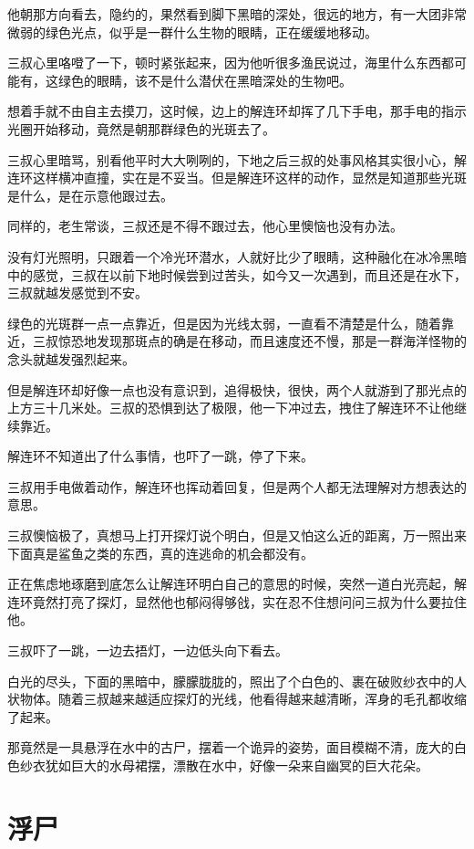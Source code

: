 他朝那方向看去，隐约的，果然看到脚下黑暗的深处，很远的地方，有一大团非常微弱的绿色光点，似乎是一群什么生物的眼睛，正在缓缓地移动。

三叔心里咯噔了一下，顿时紧张起来，因为他听很多渔民说过，海里什么东西都可能有，这绿色的眼睛，该不是什么潜伏在黑暗深处的生物吧。

想着手就不由自主去摸刀，这时候，边上的解连环却挥了几下手电，那手电的指示光圈开始移动，竟然是朝那群绿色的光斑去了。

三叔心里暗骂，别看他平时大大咧咧的，下地之后三叔的处事风格其实很小心，解连环这样横冲直撞，实在是不妥当。但是解连环这样的动作，显然是知道那些光斑是什么，是在示意他跟过去。

同样的，老生常谈，三叔还是不得不跟过去，他心里懊恼也没有办法。

没有灯光照明，只跟着一个冷光环潜水，人就好比少了眼睛，这种融化在冰冷黑暗中的感觉，三叔在以前下地时候尝到过苦头，如今又一次遇到，而且还是在水下，三叔就越发感觉到不安。

绿色的光斑群一点一点靠近，但是因为光线太弱，一直看不清楚是什么，随着靠近，三叔惊恐地发现那斑点的确是在移动，而且速度还不慢，那是一群海洋怪物的念头就越发强烈起来。

但是解连环却好像一点也没有意识到，追得极快，很快，两个人就游到了那光点的上方三十几米处。三叔的恐惧到达了极限，他一下冲过去，拽住了解连环不让他继续靠近。

解连环不知道出了什么事情，也吓了一跳，停了下来。

三叔用手电做着动作，解连环也挥动着回复，但是两个人都无法理解对方想表达的意思。

三叔懊恼极了，真想马上打开探灯说个明白，但是又怕这么近的距离，万一照出来下面真是鲨鱼之类的东西，真的连逃命的机会都没有。

正在焦虑地琢磨到底怎么让解连环明白自己的意思的时候，突然一道白光亮起，解连环竟然打亮了探灯，显然他也郁闷得够戗，实在忍不住想问问三叔为什么要拉住他。

三叔吓了一跳，一边去捂灯，一边低头向下看去。

白光的尽头，下面的黑暗中，朦朦胧胧的，照出了个白色的、裹在破败纱衣中的人状物体。随着三叔越来越适应探灯的光线，他看得越来越清晰，浑身的毛孔都收缩了起来。

那竟然是一具悬浮在水中的古尸，摆着一个诡异的姿势，面目模糊不清，庞大的白色纱衣犹如巨大的水母裙摆，漂散在水中，好像一朵来自幽冥的巨大花朵。

\chapter{浮尸}

